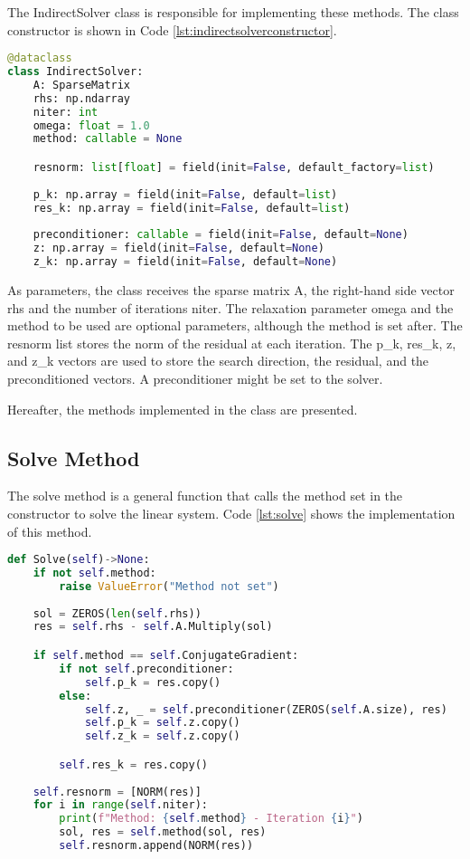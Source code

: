 The IndirectSolver class is responsible for implementing these methods. The class constructor is shown in Code \ref{lst:indirectsolverconstructor}.
\begin{lstlisting}[language=python, caption={IndirectSolver class constructor}, label={lst:indirectsolverconstructor}]
@dataclass
class IndirectSolver:
    A: SparseMatrix
    rhs: np.ndarray
    niter: int
    omega: float = 1.0
    method: callable = None

    resnorm: list[float] = field(init=False, default_factory=list)
    
    p_k: np.array = field(init=False, default=list)
    res_k: np.array = field(init=False, default=list)
    
    preconditioner: callable = field(init=False, default=None)
    z: np.array = field(init=False, default=None)
    z_k: np.array = field(init=False, default=None)
\end{lstlisting}

As parameters, the class receives the sparse matrix A, the right-hand side vector rhs and the number of iterations niter. The relaxation parameter omega and the method to be used are optional parameters, although the method is set after. The resnorm list stores the norm of the residual at each iteration. The p\_k, res\_k, z, and z\_k vectors are used to store the search direction, the residual, and the preconditioned vectors. A preconditioner might be set to the solver. 

Hereafter, the methods implemented in the class are presented.

\subsection{Solve Method}\label{sec:solve}
The solve method is a general function that calls the method set in the constructor to solve the linear system. Code \ref{lst:solve} shows the implementation of this method.
\begin{lstlisting}[language=python, caption={Solve method implementation}, label={lst:solve}]
def Solve(self)->None:
    if not self.method:
        raise ValueError("Method not set")
    
    sol = ZEROS(len(self.rhs))
    res = self.rhs - self.A.Multiply(sol)

    if self.method == self.ConjugateGradient:
        if not self.preconditioner:
            self.p_k = res.copy()
        else:
            self.z, _ = self.preconditioner(ZEROS(self.A.size), res)
            self.p_k = self.z.copy()
            self.z_k = self.z.copy()

        self.res_k = res.copy()
        
    self.resnorm = [NORM(res)]
    for i in range(self.niter):
        print(f"Method: {self.method} - Iteration {i}")
        sol, res = self.method(sol, res)
        self.resnorm.append(NORM(res))
\end{lstlisting}

